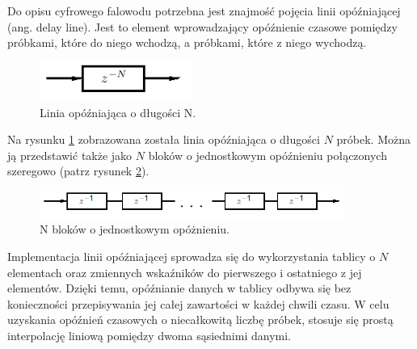 Do opisu cyfrowego falowodu potrzebna jest znajmość pojęcia linii opóźniającej (ang. delay line). Jest to element wprowadzający opóźnienie czasowe pomiędzy próbkami, które do niego wchodzą, a próbkami, które z niego wychodzą. 
\begin{figure}[H]
	\centering
	\includegraphics[width=5cm]{grafiki/linia}
	\captionsetup{justification=centering}
	\caption{Linia opóźniająca o długości N.}
	\label{rys:delay_line}
\end{figure}
Na rysunku \ref{rys:delay_line} zobrazowana została linia opóźniająca o długości $N$ próbek. Można ją przedstawić także jako $N$ bloków o jednostkowym opóźnieniu połączonych szeregowo (patrz rysunek \ref{rys:model_delay_line2}).
\begin{figure}[H]
	\centering
	\includegraphics[width=10cm]{grafiki/model_linie}
	\captionsetup{justification=centering}
	\caption{N bloków o jednostkowym opóżnieniu.}
	\label{rys:model_delay_line2}
\end{figure}
 Implementacja linii opóźniającej sprowadza się do wykorzystania tablicy o $N$ elementach oraz zmiennych wskaźników do pierwszego i ostatniego z jej elementów. Dzięki temu, opóźnianie danych w tablicy odbywa się bez konieczności przepisywania jej całej zawartości w każdej chwili czasu. W celu uzyskania opóźnień czasowych o niecałkowitą liczbę próbek, stosuje się prostą interpolację liniową pomiędzy dwoma sąsiednimi danymi.


